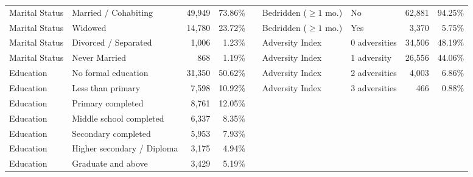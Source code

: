 \begin{table}[!htbp]
\begin{singlespace}
{\begin{tabular}{llrr c llrr}
Marital Status & Married / Cohabiting & 49,949 & 73.86\% & & Bedridden ($\ge 1$ mo.) & No & 62,881 & 94.25\% \\
Marital Status & Widowed & 14,780 & 23.72\% & & Bedridden ($\ge 1$ mo.) & Yes & 3,370 & 5.75\% \\
\cmidrule(lr){6-9}
Marital Status & Divorced / Separated & 1,006 & 1.23\% & & Adversity Index & 0 adversities & 34,506 & 48.19\% \\
Marital Status & Never Married & 868 & 1.19\% & & Adversity Index & 1 adversity & 26,556 & 44.06\% \\
\cmidrule(lr){1-4}
Education & No formal education & 31,350 & 50.62\% & & Adversity Index & 2 adversities & 4,003 & 6.86\% \\
Education & Less than primary & 7,598 & 10.92\% & & Adversity Index & 3 adversities & 466 & 0.88\% \\
Education & Primary completed & 8,761 & 12.05\% & & & & & \\
Education & Middle school completed & 6,337 & 8.35\% & & & & & \\
Education & Secondary completed & 5,953 & 7.93\% & & & & & \\
Education & Higher secondary / Diploma & 3,175 & 4.94\% & & & & & \\
Education & Graduate and above & 3,429 & 5.19\% & & & & & \\
\bottomrule
\end{tabular}%
}
\end{singlespace}
\end{table}

